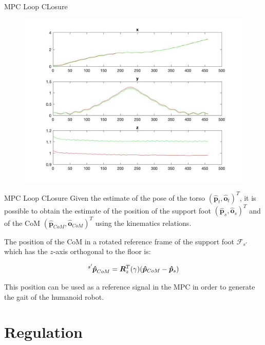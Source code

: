 \documentclass[10pt]{beamer}
\begin{document}
    \begin{frame}{MPC Loop CLosure}
    	\begin{figure}
    	    \centering
    	    \includegraphics[scale=0.2]{images/comp_estimated_torso_com.jpg}
    	    \label{fig:my_label}
    	\end{figure}
    \end{frame}

    \begin{frame}{MPC Loop CLosure}
    	Given the estimate of the pose of the torso
        $(\bm{\hat{p}}_t, \bm{\hat{o}}_t)^T$,
        it is possible to obtain the estimate of the position of the support foot
        $(\bm{\hat{p}}_s, \bm{\hat{o}}_s)^T$  and of the CoM $(\bm{\hat{p}}_{CoM}, \bm{\hat{o}}_{CoM})^T$  using the kinematics relations.

        The position of the CoM in a rotated
        reference frame of the support foot $\mathcal{F}_{s'}$ which has the $z$-axis
        orthogonal to the floor is:

        \begin{equation*}
            \tensor[^{s'}]{\bm{\hat{p}}}{_{CoM}} = \bm{R}^{T}_{z}(\gamma)(\bm{\hat{p}}_{CoM}-\bm{\hat{p}}_{s})
        \end{equation*}

        This position can be used as a reference signal
        in the MPC in order to generate the gait of the humanoid robot.
    \end{frame}

    \section{Regulation}
\end{document}
